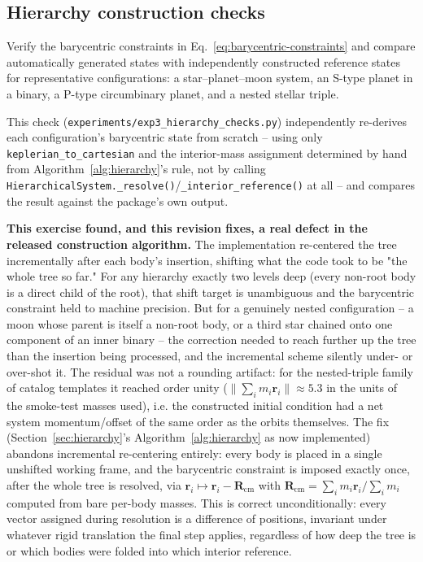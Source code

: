 \documentclass[11pt]{article}
\begin{document}
\subsection{Hierarchy construction checks}

Verify the barycentric constraints in
Eq.~\eqref{eq:barycentric-constraints} and compare automatically generated
states with independently constructed reference states for representative
configurations: a star--planet--moon system, an S-type planet in a binary, a
P-type circumbinary planet, and a nested stellar triple.

This check (\texttt{experiments/exp3\_hierarchy\_checks.py})
independently re-derives each configuration's barycentric state from
scratch -- using only \texttt{keplerian\_to\_cartesian} and the interior-mass
assignment determined by hand from Algorithm~\ref{alg:hierarchy}'s rule, not
by calling \texttt{HierarchicalSystem.\_resolve()}/\texttt{\_interior\_reference()}
at all -- and compares the result against the package's own output.

\textbf{This exercise found, and this revision fixes, a real defect in the
released construction algorithm.} The implementation re-centered the tree
incrementally after each body's insertion, shifting what the code took to be
"the whole tree so far." For any hierarchy exactly two levels deep (every
non-root body is a direct child of the root), that shift target is
unambiguous and the barycentric constraint held to machine precision. But for
a genuinely nested configuration -- a moon whose parent is itself a
non-root body, or a third star chained onto one component of an inner
binary -- the correction needed to reach further up the tree than the
insertion being processed, and the incremental scheme silently under- or
over-shot it. The residual was not a rounding artifact: for the nested-triple
family of catalog templates it reached order unity ($\lVert\sum_i m_i\bm
r_i\rVert \approx 5.3$ in the units of the smoke-test masses used), i.e. the
constructed initial condition had a net system momentum/offset of the same
order as the orbits themselves. The fix (Section~\ref{sec:hierarchy}'s
Algorithm~\ref{alg:hierarchy} as now implemented) abandons incremental
re-centering entirely: every body is placed in a single unshifted working
frame, and the barycentric constraint is imposed exactly once, after the
whole tree is resolved, via $\bm r_i \mapsto \bm r_i - \bm R_{\mathrm{cm}}$
with $\bm R_{\mathrm{cm}}=\sum_i m_i\bm r_i/\sum_i m_i$ computed from bare
per-body masses. This is correct unconditionally: every vector assigned
during resolution is a difference of positions, invariant under whatever
rigid translation the final step applies, regardless of how deep the tree
is or which bodies were folded into which interior reference.
\end{document}
